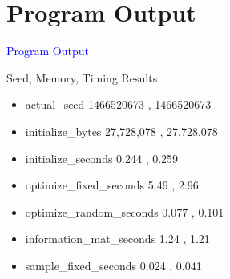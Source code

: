 \documentclass{beamer}
\newcommand{\Blue}[1]{\textcolor{blue}{#1}}
\newcommand{\Section}[1]{
    \section{#1}
    \begin{frame}
    \begin{center}
    \Blue{ \Large{#1} }
    \end{center}
    \end{frame}
}
\begin{document}
\Section{Program Output}
\begin{frame}{Seed, Memory, Timing Results}
\begin{itemize}

\item
actual\_seed
\hspace{5.9em} 1466520673 , 1466520673
\pause

\item
initialize\_bytes
\hspace{4.6em} 27,728,078 , 27,728,078
\pause

\item
initialize\_seconds
\hspace{3.6em} 0.244 , 0.259
\pause

\item
optimize\_fixed\_seconds
\hspace{1.3em} 5.49 , 2.96
\pause

\item
optimize\_random\_seconds
\hspace{0.05em} 0.077 , 0.101
\pause

\item
information\_mat\_seconds
\hspace{0.25em} 1.24 , 1.21
\pause

\item
sample\_fixed\_seconds
\hspace{1.9em} 0.024 , 0.041
\pause

\end{itemize}
\end{frame}
\end{document}
